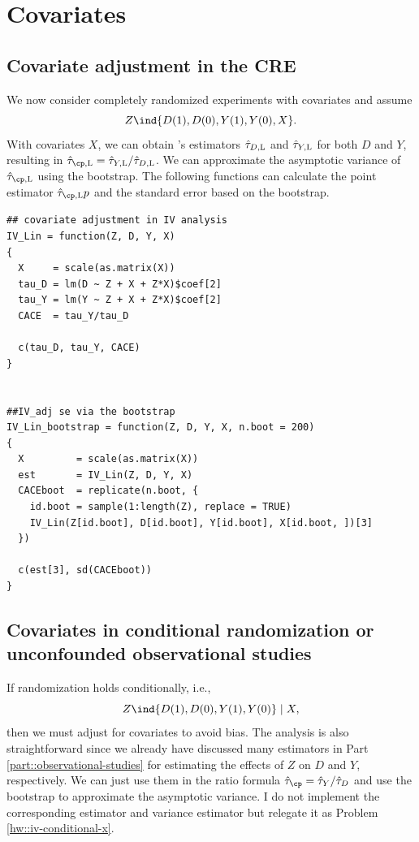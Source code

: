 \section{Covariates}

\subsection{Covariate adjustment in the CRE}

We now consider completely randomized experiments with covariates and assume 
$$
Z\ind \{ D(1), D(0), Y(1), Y(0), X \}.
$$
With covariates $X$, we can obtain \citet{lin2013}'s estimators $\hat{\tau}_{D,\textsc{L}}$ and $\hat{\tau}_{Y,\textsc{L}}$ for both $D$ and $Y$, resulting in $\hat{\tau}_{\cp, \textsc{L}} = \hat{\tau}_{Y,\textsc{L}} / \hat{\tau}_{D,\textsc{L}}$. 
 We can approximate the asymptotic variance of $\hat{\tau}_{\cp, \textsc{L}} $ using the bootstrap. The following functions can calculate the point estimator $\hat{\tau}_{\cp, \textsc{L}}p $ and the standard error based on the bootstrap. 
 
\begin{lstlisting}
## covariate adjustment in IV analysis
IV_Lin = function(Z, D, Y, X)
{
  X     = scale(as.matrix(X))
  tau_D = lm(D ~ Z + X + Z*X)$coef[2]
  tau_Y = lm(Y ~ Z + X + Z*X)$coef[2]
  CACE  = tau_Y/tau_D
  
  c(tau_D, tau_Y, CACE)
}


##IV_adj se via the bootstrap
IV_Lin_bootstrap = function(Z, D, Y, X, n.boot = 200)
{
  X         = scale(as.matrix(X))
  est       = IV_Lin(Z, D, Y, X)
  CACEboot  = replicate(n.boot, {
    id.boot = sample(1:length(Z), replace = TRUE)
    IV_Lin(Z[id.boot], D[id.boot], Y[id.boot], X[id.boot, ])[3]
  })
  
  c(est[3], sd(CACEboot))
}
\end{lstlisting}

\subsection{Covariates in conditional randomization or unconfounded observational studies}
\label{section::unconfounded-IV}

If randomization holds conditionally, i.e.,
$$
Z\ind \{ D(1), D(0), Y(1), Y(0) \} \mid  X,
$$
then we must adjust for covariates to avoid bias. The analysis is also straightforward since we already have discussed many estimators in Part \ref{part::observational-studies} for estimating the effects of $ Z$ on $D$ and $Y$, respectively. We can just use them in the ratio formula $\hat{\tau}_\cp = \hat{\tau}_Y / \hat{\tau}_D$ and use the bootstrap to approximate the asymptotic variance. 
I do not implement the corresponding estimator and variance estimator but relegate it as Problem \ref{hw::iv-conditional-x}. 



